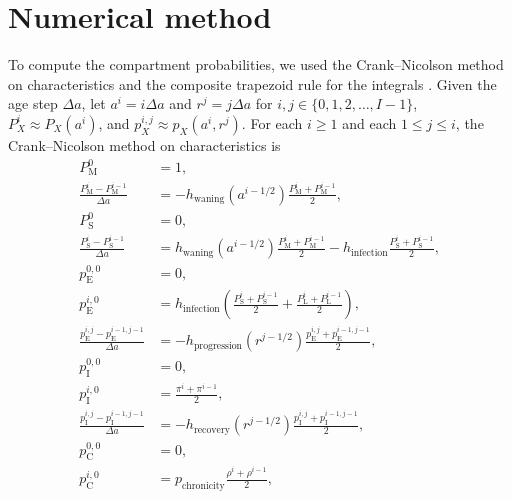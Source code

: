 \documentclass[12pt]{article}
\begin{document}
\section{Numerical method}

To compute the compartment probabilities, we used the Crank--Nicolson
method on characteristics and the composite trapezoid rule for the
integrals \citep{milner_1992}.  Given the age step $\Delta a$, let
$a^i = i \Delta a$ and $r^j = j \Delta a$ for $i, j \in \{0, 1, 2,
\ldots, I - 1\}$, $P_X^i \approx P_X(a^i)$, and $p_X^{i, j} \approx
p_X(a^i, r^j)$.  For each $i \geq 1$ and each $1 \leq j \leq i$, the
Crank--Nicolson method on characteristics is
\begin{equation}
  \begin{split}
    P_{\mathrm{M}}^0 &= 1,
    \\
    \frac{P_{\mathrm{M}}^i - P_{\mathrm{M}}^{i - 1}}{\Delta a}
    &= - h_{\text{waning}}(a^{i - 1 / 2})
    \frac{P_{\mathrm{M}}^i + P_{\mathrm{M}}^{i - 1}}{2},
    \\
    P_{\mathrm{S}}^0 &= 0,
    \\
    \frac{P_{\mathrm{S}}^i - P_{\mathrm{S}}^{i - 1}}{\Delta a}
    &= h_{\text{waning}}(a^{i - 1 / 2})
    \frac{P_{\mathrm{M}}^i + P_{\mathrm{M}}^{i - 1}}{2}
    - h_{\text{infection}}
    \frac{P_{\mathrm{S}}^i + P_{\mathrm{S}}^{i - 1}}{2},
    \\
    p_{\mathrm{E}}^{0, 0} &= 0,
    \\
    p_{\mathrm{E}}^{i, 0} &= h_{\text{infection}}
    \left(\frac{P_{\mathrm{S}}^i + P_{\mathrm{S}}^{i - 1}}{2}
    + \frac{P_{\mathrm{L}}^i + P_{\mathrm{L}}^{i - 1}}{2}\right),
    \\
    \frac{p_{\mathrm{E}}^{i, j} - p_{\mathrm{E}}^{i - 1, j - 1}}{\Delta a}
    &= - h_{\text{progression}}(r^{j - 1 / 2})
    \frac{p_{\mathrm{E}}^{i, j} + p_{\mathrm{E}}^{i - 1, j - 1}}{2},
    \\
    p_{\mathrm{I}}^{0, 0} &= 0,
    \\
    p_{\mathrm{I}}^{i, 0} &=
    \frac{\pi^i + \pi^{i - 1}}{2},
    \\
    \frac{p_{\mathrm{I}}^{i, j} - p_{\mathrm{I}}^{i - 1, j - 1}}{\Delta a}
    &= - h_{\text{recovery}}(r^{j - 1 / 2})
    \frac{p_{\mathrm{I}}^{i, j} + p_{\mathrm{I}}^{i - 1, j - 1}}{2},
    \\
    p_{\mathrm{C}}^{0, 0} &= 0,
    \\
    p_{\mathrm{C}}^{i, 0} &= p_{\text{chronicity}}
    \frac{\rho^i + \rho^{i - 1}}{2},
    \\

\end{split}
\end{equation}
\end{document}
